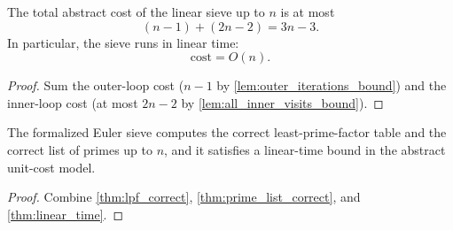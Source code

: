 \begin{theorem}
    \label{thm:linear_time}
    The total abstract cost of the linear sieve up to $n$ is at most
    \[
        (n-1) + (2n-2) = 3n-3.
    \]
    In particular, the sieve runs in linear time:
    \[
        \mathrm{cost} = O(n).
    \]
\end{theorem}
\begin{proof}
    Sum the outer-loop cost ($n-1$ by \ref{lem:outer_iterations_bound}) and the inner-loop cost (at most $2n-2$ by \ref{lem:all_inner_visits_bound}).
\end{proof}

\begin{corollary}
    \label{cor:verified_linear_sieve}
    The formalized Euler sieve computes the correct least-prime-factor table and the correct list of primes up to $n$, and it satisfies a linear-time bound in the abstract unit-cost model.
\end{corollary}
\begin{proof}
    Combine \ref{thm:lpf_correct}, \ref{thm:prime_list_correct}, and \ref{thm:linear_time}.
\end{proof}
